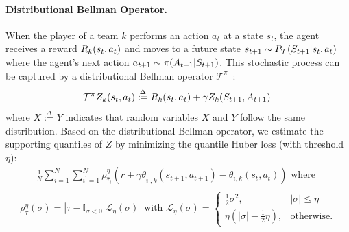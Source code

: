 \documentclass{article}
\newcommand{\state}{s}
\newcommand{\action}{a}
\newcommand{\transition}{t}
\newcommand{\reward}{r}
\newcommand{\agentIndex}{k}
\newcommand{\quantielIndex}{i}
\newcommand{\expect}{\mathbb{E}}
\begin{document}
\paragraph{Distributional Bellman Operator.}
When the player of a team $\agentIndex$ performs an action $\action_t$
at a state $\state_t$, the agent receives a reward $\MakeUppercase{\reward}_{\agentIndex}(\state_t,\action_t)$ and moves to a future state $\state_{t+1}\sim P_{\mathcal{\MakeUppercase{\transition}}}(\MakeUppercase{\state}_{t+1}|\state_t,\action_t)$ where the agent's next action $\action_{t+1}\sim\pi(\MakeUppercase{\action}_{t+1}|\MakeUppercase{\state}_{t+1})$. This stochastic process can be captured by a distributional Bellman operator $\mathcal{T}^{\pi}$~\cite{bellemare2017distributional}:
\begin{equation}
    \mathcal{T}^{\pi}{Z}_{\agentIndex}(\state_t,\action_t) \overset{\Delta}{:=} \MakeUppercase{\reward}_{\agentIndex}(\state_t,\action_t) + \gamma {Z}_{\agentIndex}(\MakeUppercase{\state}_{t+1},\MakeUppercase{\action}_{t+1})~\label{eqn:bellman-operator}
\end{equation}
where $X\overset{\Delta}{:=}Y$ indicates that random variables $X$ and $Y$ follow the same distribution.
Based on the distributional Bellman operator, we estimate the supporting quantiles of $Z$ by minimizing the quantile Huber loss (with threshold $\eta$):
\begin{align}
    \frac{1}{N}\sum_{\quantielIndex=1}^N\sum_{\quantielIndex^{\prime}=1}^N\rho^{\eta}_{\hat{\tau}_\quantielIndex}(\reward+\gamma\theta_{\quantielIndex^{\prime},\agentIndex}(\state_{t+1},\action_{t+1})-\theta_{\quantielIndex,\agentIndex}(\state_{t},\action_{t})) \text{ where }\nonumber~\label{eq:huber}
\end{align}%
\begin{align}
    \begin{split}
    \rho_{\tau}^{\eta}(\sigma) = |\tau - \mathbb{I}_{\sigma<0}|\mathcal{L}_{\eta}(\sigma)~\text{ with }
    \mathcal{L}_{\eta}(\sigma) = \begin{cases}
    \tfrac12 \sigma^2, & |\sigma| \leq \eta\\
    \eta(|\sigma|-\frac12 \eta), & \mathrm{otherwise}.
\end{cases}
\end{split}
\end{align}
\end{document}
